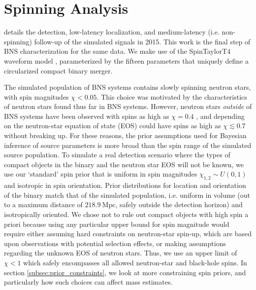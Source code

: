 \section{Spinning Analysis}
\label{sec:spin}

\citet{Singer_2014} details the detection, low-latency localization, and medium-latency (i.e. non-spinning) follow-up of the simulated signals in 2015. This work is the final step of BNS characterization for the same data. We make use of the SpinTaylorT4 waveform model \citep{Buonanno_2003,Buonanno_2009}, parameterized by the fifteen parameters that uniquely define a circularized compact binary merger.

The simulated population of BNS systems contains slowly spinning neutron stars, with spin magnitudes $\chi < 0.05$.  This choice was motivated by the characteristics of neutron stars found thus far in BNS systems. However, neutron stars \emph{outside} of BNS systems have been observed with spins as high as $\chi = 0.4$ \citep{Hessels_2006,Brown_2012}, and depending on the neutron-star equation of state (EOS) could have spins as high as $\chi \lesssim 0.7$ \citep{Lo_2011} without breaking up.  For these reasons, the prior assumptions used for Bayesian inference of source parameters is more broad than the spin range of the simulated source population.  To simulate a real detection scenario where the types of compact objects in the binary and the neutron star EOS will not be known, we use our `standard' spin prior that is uniform in spin magnitudes $\chi_{1,2} \sim U(0, 1)$ and isotropic in spin orientation. Prior distributions for location and orientation of the binary match that of the simulated population, i.e. uniform in volume (out to a maximum distance of $218.9~\mathrm{Mpc}$, safely outside the detection horizon) and isotropically oriented.  We chose not to rule out compact objects with high spin a priori because using any particular upper bound for spin magnitude would require either assuming hard constraints on neutron-star spin-up, which are based upon observations with potential selection effects, or making assumptions regarding the unknown EOS of neutron stars. Thus, we use an upper limit of $\chi < 1$ which safely encompasses all allowed neutron-star and black-hole spins.  In section \ref{subsec:prior_constraints}, we look at more constraining spin priors, and particularly how such choices can affect mass estimates.